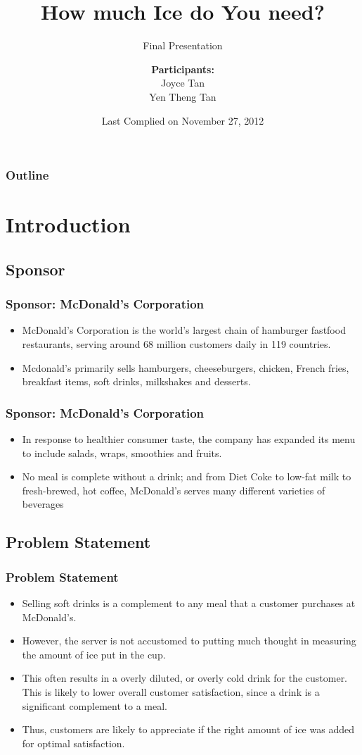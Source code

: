 \documentclass[compress,handout,10pt]{beamer}
\title{{\color{blue} \LARGE How much Ice do You need?\newline} }
\subtitle{{\color{red} \large Final Presentation} }
\author{ 
    {\bf{Participants:}} \\ 
Joyce Tan \\ 
Yen Theng Tan \\
    \vspace{5pt}
}
\institute{JHU AMS 2012 FALL}
\date{\mygreen Last Complied on November 27, 2012}
\let\olditem\item
\renewcommand{\item}{\setlength{\itemsep}{0.5\baselineskip}\olditem}
\begin{document}
\begin{frame}[plain]
    \titlepage
\end{frame}


\begin{frame}
    \frametitle{Outline}
      \tableofcontents
\end{frame}

\section{Introduction}
\subsection{Sponsor}
\begin{frame}
    \frametitle{Sponsor: McDonald's Corporation}
    \begin{itemize}
     \item McDonald's Corporation is the world's largest chain of hamburger fastfood restaurants, serving around 68 million customers daily in 119 countries.
\item Mcdonald's primarily sells hamburgers, cheeseburgers, chicken, French fries, breakfast items, soft drinks, milkshakes and desserts. 
    \end{itemize}
\end{frame}

\begin{frame}
    \frametitle{Sponsor: McDonald's Corporation}
    \begin{itemize}
         	\item In response to healthier consumer taste, the company has expanded its menu to include salads, wraps, smoothies and fruits.
	 \item No meal is complete without a drink; and from Diet Coke to low-fat milk to fresh-brewed, hot coffee, McDonald's serves many different varieties of beverages
    \end{itemize}
\end{frame}

\subsection{Problem Statement}
\begin{frame}
    \frametitle{Problem Statement}
     \begin{itemize}
         \item Selling soft drinks is a complement to any meal that a customer purchases at McDonald's.
\item However, the server is not accustomed to putting much thought in measuring the amount of ice put in the cup.
\item This often results in a overly diluted, or overly cold drink for the customer. This is likely to lower overall customer satisfaction, since a drink is a significant complement to a meal. 
\item Thus, customers are likely to appreciate if the right amount of ice was added for optimal satisfaction.
     \end{itemize}
\end{frame}
\end{document}
